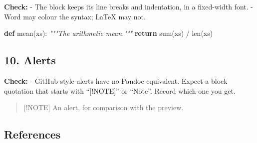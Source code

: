 \documentclass[
]{article}
\newenvironment{Shaded}{}{}
\newcommand{\BuiltInTok}[1]{\textcolor[rgb]{0.00,0.50,0.00}{#1}}
\newcommand{\CommentTok}[1]{\textcolor[rgb]{0.38,0.63,0.69}{\textit{#1}}}
\newcommand{\ControlFlowTok}[1]{\textcolor[rgb]{0.00,0.44,0.13}{\textbf{#1}}}
\newcommand{\KeywordTok}[1]{\textcolor[rgb]{0.00,0.44,0.13}{\textbf{#1}}}
\newcommand{\NormalTok}[1]{#1}
\newcommand{\OperatorTok}[1]{\textcolor[rgb]{0.40,0.40,0.40}{#1}}
\begin{document}
\textbf{Check:} - The block keeps its line breaks and indentation, in a
fixed-width font. - Word may colour the syntax; LaTeX may not.

\begin{Shaded}
\begin{Highlighting}[]
\KeywordTok{def}\NormalTok{ mean(xs):}
    \CommentTok{"""The arithmetic mean."""}
    \ControlFlowTok{return} \BuiltInTok{sum}\NormalTok{(xs) }\OperatorTok{/} \BuiltInTok{len}\NormalTok{(xs)}
\end{Highlighting}
\end{Shaded}

\subsection{10. Alerts}\label{alerts}

\textbf{Check:} - GitHub-style alerts have no Pandoc equivalent. Expect
a block quotation that starts with ``{[}!NOTE{]}'' or ``Note''. Record
which one you get.

\begin{quote}
{[}!NOTE{]} An alert, for comparison with the preview.
\end{quote}

\subsection*{References}\label{references}
\end{document}
